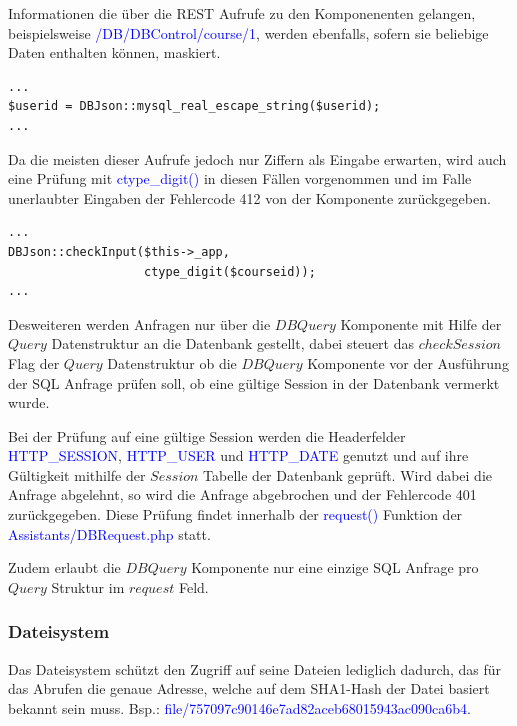 \documentclass[10pt,a4paper,final,parskip]{scrartcl}
\newcommand{\blau}[1]{\textcolor{blue}{#1}}
\begin{document}
Informationen die über die REST Aufrufe zu den Komponenenten gelangen, beispielsweise \blau{/DB/DBControl/course/1}, werden ebenfalls, sofern sie beliebige Daten enthalten können, maskiert. 

\begin{minipage}{\textwidth}
\begin{lstlisting}
...
$userid = DBJson::mysql_real_escape_string($userid);
...
\end{lstlisting}
\end{minipage}

Da die meisten dieser Aufrufe jedoch nur Ziffern als Eingabe erwarten, wird auch eine Prüfung mit \blau{ctype\_digit()} in diesen Fällen vorgenommen und im Falle unerlaubter Eingaben der Fehlercode 412 von der Komponente zurückgegeben.

\begin{minipage}{\textwidth}
\begin{lstlisting}
...
DBJson::checkInput($this->_app, 
                   ctype_digit($courseid));
...
\end{lstlisting}
\end{minipage}

Desweiteren werden Anfragen nur über die $DBQuery$ Komponente mit Hilfe der $Query$ Datenstruktur an die Datenbank gestellt, dabei steuert das $checkSession$ Flag der $Query$ Datenstruktur ob die $DBQuery$ Komponente vor der Ausführung der SQL Anfrage prüfen soll, ob eine gültige Session in der Datenbank vermerkt wurde. 

Bei der Prüfung auf eine gültige Session werden die Headerfelder \blau{HTTP\_SESSION}, \blau{HTTP\_USER} und \blau{HTTP\_DATE} genutzt und auf ihre Gültigkeit mithilfe der $Session$ Tabelle der Datenbank geprüft. Wird dabei die Anfrage abgelehnt, so wird die Anfrage abgebrochen und der Fehlercode 401 zurückgegeben. Diese Prüfung findet innerhalb der \blau{request()} Funktion der \blau{Assistants/DBRequest.php} statt.

Zudem erlaubt die $DBQuery$ Komponente nur eine einzige SQL Anfrage pro $Query$ Struktur im $request$ Feld.

\subsubsection{Dateisystem}
Das Dateisystem schützt den Zugriff auf seine Dateien lediglich dadurch, das für das Abrufen die genaue Adresse, welche auf dem SHA1-Hash der Datei basiert bekannt sein muss.
Bsp.: \blau{file/757097c90146e7ad82aceb68015943ac090ca6b4}.
\end{document}
